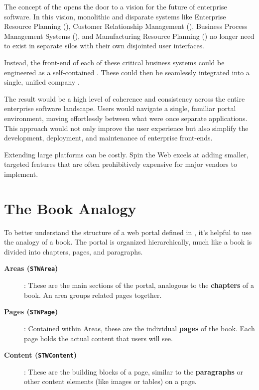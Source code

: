The concept of the \textbf{\webbaselet{}} opens the door to a vision for the future of enterprise software. In this vision, monolithic and disparate systems like Enterprise Resource Planning (\erp{}), Customer Relationship Management (\crm{}), Business Process Management Systems (\bpms{}), and Manufacturing Resource Planning (\mrp{}) no longer need to exist in separate silos with their own disjointed user interfaces.

Instead, the front-end of each of these critical business systems could be engineered as a self-contained \textbf{\webbaselet{}}. These  could then be seamlessly integrated into a single, unified company \textbf{\webbase{}}.

The result would be a high level of coherence and consistency across the entire enterprise software landscape. Users would navigate a single, familiar portal environment, moving effortlessly between what were once separate applications. This approach would not only improve the user experience but also simplify the development, deployment, and maintenance of enterprise front-ends.

Extending large platforms can be costly. Spin the Web excels at adding smaller, targeted features that are often prohibitively expensive for major vendors to implement.

\section{The Book Analogy}
\label{sec:book-analogy}

To better understand the structure of a web portal defined in \wbdl{}, it's helpful to use the analogy of a book. The portal is organized hierarchically, much like a book is divided into chapters, pages, and paragraphs.

\begin{description}
\item[\textbf{Areas (\texttt{STWArea})}]: These are the main sections of the portal, analogous to the \textbf{chapters} of a book. An area groups related pages together.
\item[\textbf{Pages (\texttt{STWPage})}]: Contained within Areas, these are the individual \textbf{pages} of the book. Each page holds the actual content that users will see.
\item[\textbf{Content (\texttt{STWContent})}]: These are the building blocks of a page, similar to the \textbf{paragraphs} or other content elements (like images or tables) on a page.
\end{description}

